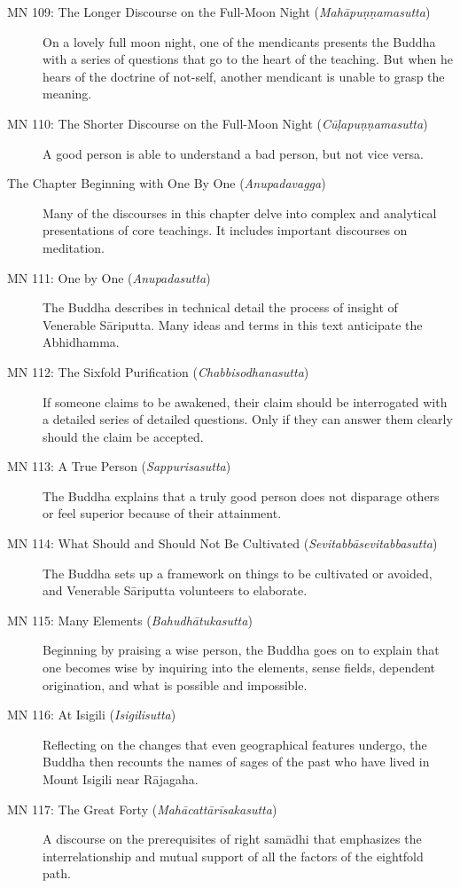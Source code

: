 \documentclass[12pt,openany]{book}%
\begin{document}
\begin{description}
\item[MN 109: The Longer Discourse on the Full-Moon Night (\textit{\textsanskrit{Mahāpuṇṇamasutta}})] On a lovely full moon night, one of the mendicants presents the Buddha with a series of questions that go to the heart of the teaching. But when he hears of the doctrine of not-self, another mendicant is unable to grasp the meaning.%
\item[MN 110: The Shorter Discourse on the Full-Moon Night (\textit{\textsanskrit{Cūḷapuṇṇamasutta}})] A good person is able to understand a bad person, but not vice versa.%
\item[The Chapter Beginning with One By One (\textit{\textsanskrit{Anupadavagga}})] Many of the discourses in this chapter delve into complex and analytical presentations of core teachings. It includes important discourses on meditation.%
\item[MN 111: One by One (\textit{\textsanskrit{Anupadasutta}})] The Buddha describes in technical detail the process of insight of Venerable \textsanskrit{Sāriputta}. Many ideas and terms in this text anticipate the Abhidhamma.%
\item[MN 112: The Sixfold Purification (\textit{\textsanskrit{Chabbisodhanasutta}})] If someone claims to be awakened, their claim should be interrogated with a detailed series of detailed questions. Only if they can answer them clearly should the claim be accepted.%
\item[MN 113: A True Person (\textit{\textsanskrit{Sappurisasutta}})] The Buddha explains that a truly good person does not disparage others or feel superior because of their attainment.%
\item[MN 114: What Should and Should Not Be Cultivated (\textit{\textsanskrit{Sevitabbāsevitabbasutta}})] The Buddha sets up a framework on things to be cultivated or avoided, and Venerable \textsanskrit{Sāriputta} volunteers to elaborate.%
\item[MN 115: Many Elements (\textit{\textsanskrit{Bahudhātukasutta}})] Beginning by praising a wise person, the Buddha goes on to explain that one becomes wise by inquiring into the elements, sense fields, dependent origination, and what is possible and impossible.%
\item[MN 116: At Isigili (\textit{\textsanskrit{Isigilisutta}})] Reflecting on the changes that even geographical features undergo, the Buddha then recounts the names of sages of the past who have lived in Mount Isigili near \textsanskrit{Rājagaha}.%
\item[MN 117: The Great Forty (\textit{\textsanskrit{Mahācattārīsakasutta}})] A discourse on the prerequisites of right \textsanskrit{samādhi} that emphasizes the interrelationship and mutual support of all the factors of the eightfold path.%

\end{description}
\end{document}
